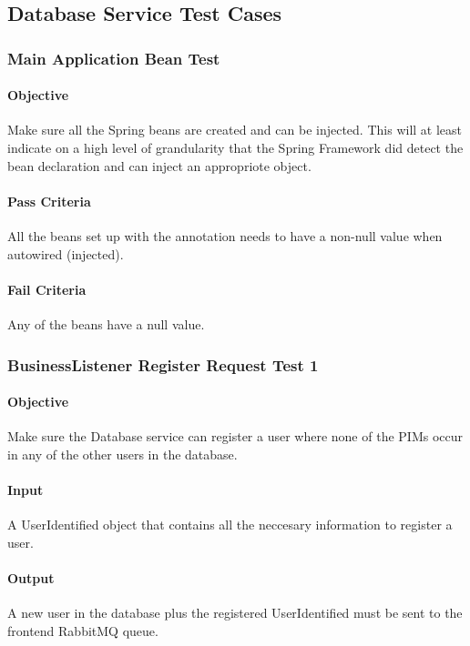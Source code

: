 \documentclass[hidelinks,english]{article}
\begin{document}
		\subsection{Database Service Test Cases}
			\subsubsection{Main Application Bean Test}\label{databaseapplicationbeanstest}
				\paragraph{Objective} Make sure all the Spring beans are created and can be injected. This will at least indicate on a high level of grandularity that the Spring Framework did detect the bean declaration and can inject an appropriote object.
				\paragraph{Pass Criteria} All the beans set up with the \emph{\@Bean} annotation needs to have a non-null value when autowired (injected).
				\paragraph{Fail Criteria} Any of the beans have a null value.
		
			\subsubsection{BusinessListener Register Request Test 1}\label{databasebusinesslistenerregistertest1}
				\paragraph{Objective} Make sure the Database service can register a user where none of the PIMs occur in any of the other users in the database.
				\paragraph{Input} A UserIdentified object that contains all the neccesary information to register a user.
				\paragraph{Output} A new user in the database plus the registered UserIdentified must be sent to the frontend RabbitMQ queue.
\end{document}
